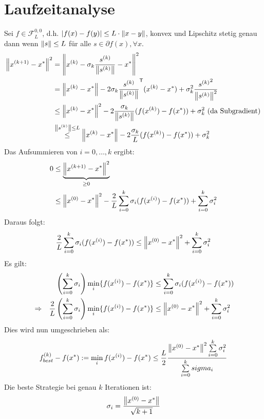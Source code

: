 \section{Laufzeitanalyse}
Sei $f\in\mathcal{F}^{0,0}_L$, d.h. $|f(x) - f(y)|\leq L\cdot\left\lVert x-y\right\rVert$, konvex und Lipschitz stetig 
genau dann wenn $\left\lVert s\right\rVert\leq L$ für alle $s\in\partial f(x), \forall x$.
\begin{align*}
 \left\lVert x^{(k+1)}-x^*\right\rVert^2  & = \left\lVert x^{(k)} - \sigma_k\frac{s^{(k)}}{\left\lVert s^{(k)}\right\rVert}-x^*\right\rVert^2 \\
 & = 
\left\lVert x^{(k)}-x^*\right\rVert-2\sigma_k\frac{s^{(k)}}{\left\lVert s^{(k)}\right\rVert}^\mathsf{T}(x^{(k)}-x^*)+\sigma_k^2 \frac{{s^{(k)}}^2}{\left\lVert s^{(k)}\right\rVert^2}\\
& \leq \left\lVert x^{(k)}-x^*\right\rVert^2-2\frac{\sigma_k}{\left\lVert s^{(k)}\right\rVert}(f(x^{(k)})-f(x^*))+\sigma_k^2 \text{ (da Subgradient)}\\
& \overset{\left\lVert s^{(k)}\right\rVert\leq L}{\leq}\left\lVert x^{(k)}-x^*\right\rVert-2\frac{\sigma_k}{L}(f(x^{(k)})-f(x^*))+\sigma_k^2\\
\end{align*}
Das Aufsummieren von $i=0,\dots,k$ ergibt:
\begin{align*}
 0 &\leq \underbrace{\left\lVert x^{(k+1)}-x^*\right\rVert^2}_{\geq 0}\\
 & \leq \left\lVert x^{(0)}-x^*\right\rVert^2 - \frac{2}{L}\sum\limits_{i=0}^k\sigma_i(f(x^{(i)})-f(x^*))+\sum\limits_{i=0}^k \sigma_i^2
\end{align*}
Daraus folgt:
\begin{equation}
 \frac{2}{L}\sum\limits_{i=0}^k\sigma_i(f(x^{(i)})-f(x^*))\leq \left\lVert x^{(0)}-x^*\right\rVert^2 +\sum\limits_{i=0}^k\sigma_i^2
\end{equation}
Es gilt:
\begin{align*}
 & & \left(\sum\limits_{i=0}^k\sigma_i\right)\min_i\{f(x^{(i)})-f(x^*)\} & \leq 
\sum\limits_{i=0}^k\sigma_i(f(x^{(i)})-f(x^*))\\
& \Rightarrow & 
\frac{2}{L}\left(\sum\limits_{i=0}^k\sigma_i\right)\min_i\{f(x^{(i)})-f(x^*)\} & \leq 
\left\lVert x^{(0)}-x^*\right\rVert^2+\sum\limits_{i=0}^k\sigma_i^2 
\end{align*}
Dies wird nun umgeschrieben als:
\begin{equation}
 f_{best}^{(k)}-f(x^*) := \min_i f(x^{(i)})-f(x^*) \leq \frac{L}{2} 
\frac{\left\lVert x^{(0)}-x^*\right\rVert^2 \sum\limits_{i=0}^k\sigma_i^2}{\sum\limits_{i=0}^ksigma_i}
\end{equation}
Die beste Strategie bei genau $k$ Iterationen ist:
\begin{equation}
 \sigma_i = \frac{\left\lVert x^{(0)} - x^*\right\rVert}{\sqrt{k+1}}
\end{equation}
